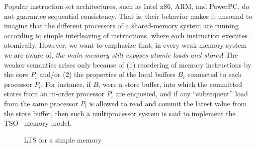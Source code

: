 %
%

Popular instruction set architectures, such as Intel x86, ARM, and PowerPC, do not guarantee sequential consistency.  That is, their behavior makes it unsound to imagine that
the different processors of a shared-memory system are running
according to simple interleaving of instructions, where each instruction executes atomically.  However, we want to emphasize that, in every weak-memory system we are aware of, \emph{the main memory still exposes atomic loads and stores}!  The weaker semantics arises only because of (1)
reordering of memory instructions by the core $P_i$ and/or (2) the
properties of the local buffers $B_i$ connected to each processor
$P_i$.  For instance, if $B_i$ were a store buffer, into which the
committed stores from an in-order processor $P_i$ are enqueued, and if
any ``subsequent'' load from the same processor $P_i$ is allowed to read and commit the latest value from the store buffer, then such a multiprocessor system is said to implement the TSO~\cite{x86tsocacm10} memory
model. 

\begin{figure}
\small
\centering
\begin{boxedminipage}[c]{.48\textwidth}
\inference
[Ins]
{}
{}

{}

{}

{}%

\end{boxedminipage}
\caption{LTS for a simple memory}
\label{$M_m$}
\end{figure}

